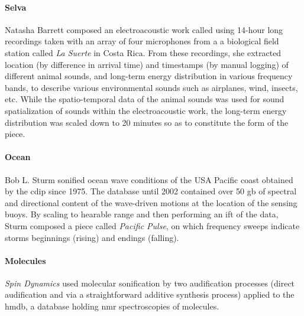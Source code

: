 \paragraph{Selva}
Natasha Barrett \parencite{icmc/bbp2372.2000.123} composed an electroacoustic work called  \parencite{Bar20:Viv} using 14-hour long recordings taken with an array of four microphones from a a biological field station called \textit{La Suerte} in Costa Rica. From these recordings, she extracted location (by difference in arrival time) and timestamps (by manual logging) of different animal sounds, and long-term energy distribution in various frequency bands, to describe various environmental sounds such as airplanes, wind, insects, etc. While the spatio-temporal data of the animal sounds was used for sound spatialization of sounds within the electroacoustic work, the long-term energy distribution was scaled down to 20 minutes so as to constitute the form of the piece.

\paragraph{Ocean}
Bob L. Sturm \parencite{icmc/bbp2372.2002.056} sonified ocean wave conditions of the USA Pacific coast obtained by the \gls{cdip} since 1975. The database until 2002 contained over 50 \gls{gb} of spectral and directional content of the wave-driven motions at the location of the sensing buoys. By scaling to hearable range and then performing an \gls{ift} of the data, Sturm composed a piece called \textit{Pacific Pulse}, on which frequency sweeps indicate storms beginnings (rising) and endings (falling).

\paragraph{Molecules}
\textit{Spin Dynamics} \parencite{icmc/bbp2372.2016.002} used molecular sonification by two audification processes (direct audification and via a straightforward additive synthesis process) applied to the \gls{hmdb}, a database holding \gls{nmr} spectroscopies of molecules.



